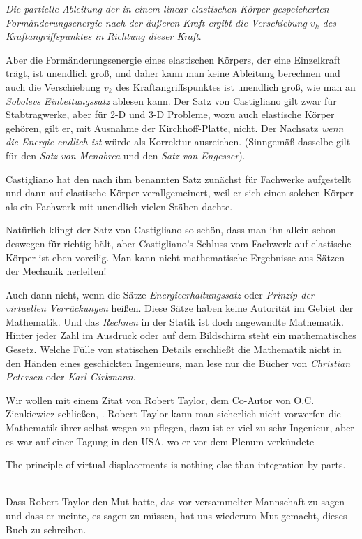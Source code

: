 {\em Die partielle Ableitung der in einem linear elastischen K\"{o}rper gespeicherten Form\"{a}nderungsenergie nach der \"{a}u{\ss}eren Kraft ergibt die Verschiebung $v_k$ des Kraftangriffspunktes in Richtung dieser Kraft\/}.

Aber die Form\"{a}nderungsenergie eines elastischen K\"{o}rpers, der eine Einzelkraft tr\"{a}gt, ist unendlich gro{\ss}, und daher kann man keine Ableitung berechnen und auch die Verschiebung $v_k$ des Kraftangriffspunktes ist unendlich gro{\ss}, wie man an {\em Sobolevs Einbettungssatz\/} ablesen kann. Der Satz von Castigliano gilt zwar f\"{u}r Stabtragwerke, aber f\"{u}r 2-D und 3-D Probleme, wozu auch elastische K\"{o}rper geh\"{o}ren, gilt er, mit Ausnahme der Kirchhoff-Platte, nicht. Der Nachsatz {\em\glq wenn die Energie endlich ist\grq{}\/} w\"{u}rde als Korrektur ausreichen. (Sinngem\"{a}{\ss} dasselbe gilt f\"{u}r den {\em Satz von Menabrea\/} und den {\em Satz von Engesser\/}).

Castigliano hat den nach ihm benannten Satz zun\"{a}chst f\"{u}r Fachwerke aufgestellt und dann auf elastische K\"{o}rper verallgemeinert, weil er sich einen solchen K\"{o}rper als ein Fachwerk mit unendlich vielen St\"{a}ben dachte.

Nat\"{u}rlich klingt der Satz von Castigliano so sch\"{o}n, dass man ihn allein schon deswegen f\"{u}r richtig h\"{a}lt, aber Castigliano's Schluss vom Fachwerk auf elastische K\"{o}rper ist eben voreilig. Man kann nicht mathematische Ergebnisse aus S\"{a}tzen der Mechanik herleiten!

Auch dann nicht, wenn die S\"{a}tze {\em Energieerhaltungssatz\/} oder {\em Prinzip der virtuellen Verr\"{u}ckungen\/} hei{\ss}en. Diese S\"{a}tze haben keine Autorit\"{a}t im Gebiet der Mathematik. Und das {\em Rechnen\/} in der Statik ist doch angewandte Mathematik. Hinter jeder Zahl im Ausdruck oder auf dem Bildschirm steht ein mathematisches Gesetz. Welche F\"{u}lle von statischen Details erschlie{\ss}t die Mathematik nicht in den H\"{a}nden eines geschickten Ingenieurs, man lese nur die B\"{u}cher von {\em Christian Petersen\/} oder {\em Karl Girkmann\/}.

Wir wollen mit einem Zitat von Robert Taylor, dem Co-Autor von O.C. Zienkiewicz schlie{\ss}en, \cite{Taylor}. Robert Taylor kann man sicherlich nicht vorwerfen die Mathematik ihrer selbst wegen zu pflegen, dazu ist er viel zu sehr Ingenieur, aber es war auf einer Tagung in den USA, wo er vor dem Plenum verk\"{u}ndete\\

\hspace*{-12pt}\colorbox{highlightBlue}{\parbox{0.98\textwidth}{The principle of virtual displacements is nothing else than integration by parts.}}\\

Dass Robert Taylor den Mut hatte, das \glq vor versammelter Mannschaft\grq{} zu sagen und dass er meinte, es sagen zu m\"{u}ssen, hat uns wiederum Mut gemacht, dieses Buch zu schreiben.

